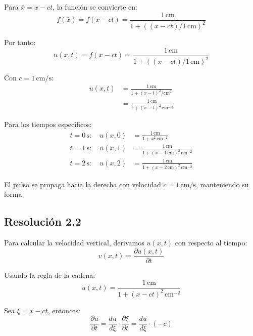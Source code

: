 \documentclass[
  11pt,
  letterpaper,
   addpoints,
   answers
  ]{exam}
\begin{document}
\begin{questions}
\begin{solution}
  Para $\bar{x} = x - ct$, la función se convierte en:
  \begin{equation}
    f(\bar{x}) = f(x-ct) = \frac{1\,\mathrm{cm}}{1 + \left((x-ct)/1\,\mathrm{cm}\right)^2}
  \end{equation}
  
  Por tanto:
  \begin{equation}
    u(x,t) = f(x-ct) = \frac{1\,\mathrm{cm}}{1 + \left((x-ct)/1\,\mathrm{cm}\right)^2}
  \end{equation}
  
  Con $c = 1\,\mathrm{cm/s}$:
  \begin{align}
    u(x,t) &= \frac{1\,\mathrm{cm}}{1 + (x-t)^2/\mathrm{cm}^2} \\
    &= \frac{1\,\mathrm{cm}}{1 + (x-t)^2\,\mathrm{cm}^{-2}}
  \end{align}
  
  Para los tiempos específicos:
  \begin{align}
    t = 0\,\mathrm{s}: \quad u(x,0) &= \frac{1\,\mathrm{cm}}{1 + x^2\,\mathrm{cm}^{-2}} \\
    t = 1\,\mathrm{s}: \quad u(x,1) &= \frac{1\,\mathrm{cm}}{1 + (x-1\,\mathrm{cm})^2\,\mathrm{cm}^{-2}} \\
    t = 2\,\mathrm{s}: \quad u(x,2) &= \frac{1\,\mathrm{cm}}{1 + (x-2\,\mathrm{cm})^2\,\mathrm{cm}^{-2}}
  \end{align}
  
  El pulso se propaga hacia la derecha con velocidad $c = 1\,\mathrm{cm/s}$, manteniendo su forma.
  
  \subsection*{Resolución 2.2}
  
  Para calcular la velocidad vertical, derivamos $u(x,t)$ con respecto al tiempo:
  \begin{equation}
    v(x,t) = \frac{\partial u(x,t)}{\partial t}
  \end{equation}
  
  Usando la regla de la cadena:
  \begin{equation}
    u(x,t) = \frac{1\,\mathrm{cm}}{1 + (x-ct)^2\,\mathrm{cm}^{-2}}
  \end{equation}
  
  Sea $\xi = x - ct$, entonces:
  \begin{equation}
    \frac{\partial u}{\partial t} = \frac{du}{d\xi} \cdot \frac{\partial \xi}{\partial t} = \frac{du}{d\xi} \cdot (-c)
  \end{equation}
  

\end{solution}
\end{questions}
\end{document}
